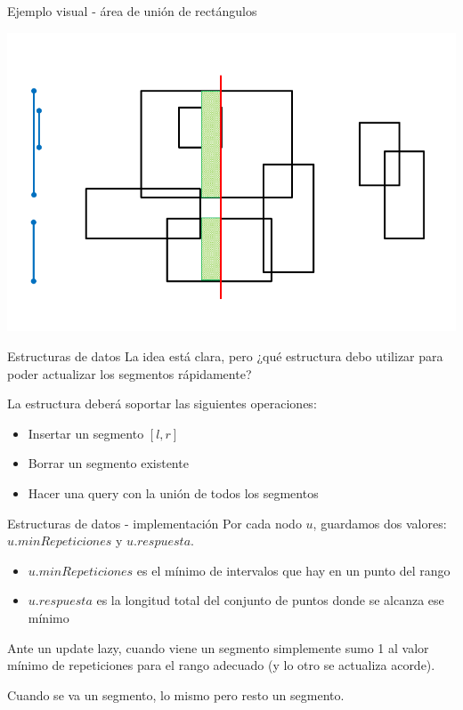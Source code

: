 \documentclass[compress]{beamer}
\newcommand{\bigpause}{\bigskip \pause}
\begin{document}
\begin{frame}{Ejemplo visual - área de unión de rectángulos}
\begin{center}
\includegraphics[scale=0.4]{images/sweep_line_11.png}
\end{center}
\end{frame}

\begin{frame}{Estructuras de datos}
La idea está clara, pero ¿qué estructura debo utilizar para poder actualizar
los segmentos rápidamente?

\bigpause

La estructura deberá soportar las siguientes operaciones:
\begin{itemize}
\item Insertar un segmento $[l, r]$
\item Borrar un segmento existente
\item Hacer una query con la unión de todos los segmentos
\end{itemize}
\end{frame}

\begin{frame}{Estructuras de datos - implementación}
Por cada nodo $u$, guardamos dos valores: $u.minRepeticiones$ y $u.respuesta$.

\begin{itemize}
\item $u.minRepeticiones$ es el mínimo de intervalos que hay en un punto del rango
\item $u.respuesta$ es la longitud total del conjunto de puntos donde se alcanza ese mínimo
\end{itemize}

Ante un update lazy, cuando viene un segmento simplemente sumo 1 al valor mínimo
de repeticiones para el rango adecuado (y lo otro se actualiza acorde).

Cuando se va un segmento, lo mismo pero resto un segmento.

\end{frame}
\end{document}
